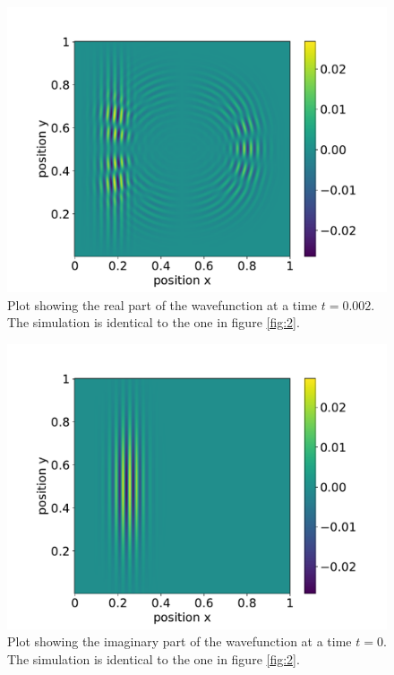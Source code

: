 \documentclass[english,notitlepage,reprint,nofootinbib]{revtex4-1}  %
\begin{document}
\begin{figure}[h!]
    \centering %
    \includegraphics[scale=0.35]{figures/contur_rel_2_T.pdf} %
    \caption{Plot showing the real part of the wavefunction at a time $t=0.002$. The simulation is identical to the one in figure \ref{fig:2}.}
    \label{fig:7}
\end{figure}
\FloatBarrier


\begin{figure}[h!]
    \centering %
    \includegraphics[scale=0.35]{figures/contur_imag_2_t0.pdf} %
    \caption{Plot showing the imaginary part of the wavefunction at a time $t=0$. The simulation is identical to the one in figure \ref{fig:2}.}
    \label{fig:8}
\end{figure}
\FloatBarrier
\end{document}
